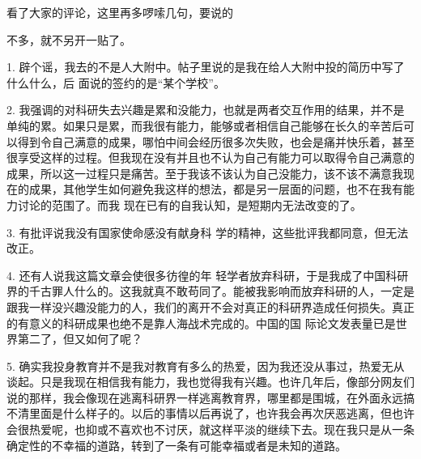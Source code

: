 \documentclass{article}
\begin{document}
看了大家的评论，这里再多啰嗦几句，要说的

\newpage
不多，就不另开一贴了。 

1. 辟个谣，我去的不是人大附中。帖子里说的是我在给人大附中投的简历中写了什么什么，后
面说的签约的是“某个学校”。 

2. 我强调的对科研失去兴趣是累和没能力，也就是两者交互作用的结果，并不是单纯的累。如果只是累，而我很有能力，能够或者相信自己能够在长久的辛苦后可以得到令自己满意的成果，哪怕中间会经历很多次失败，也会是痛并快乐着，甚至很享受这样的过程。但我现在没有并且也不认为自己有能力可以取得令自己满意的成果，所以这一过程只是痛苦。至于我该不该认为自己没能力，该不该不满意我现在的成果，其他学生如何避免我这样的想法，都是另一层面的问题，也不在我有能力讨论的范围了。而我
现在已有的自我认知，是短期内无法改变的了。 

3. 有批评说我没有国家使命感没有献身科
学的精神，这些批评我都同意，但无法改正。 

4. 还有人说我这篇文章会使很多彷徨的年
\newpage
轻学者放弃科研，于是我成了中国科研界的千古罪人什么的。这我就真不敢苟同了。能被我影响而放弃科研的人，一定是跟我一样没兴趣没能力的人，我们的离开不会对真正的科研界造成任何损失。真正的有意义的科研成果也绝不是靠人海战术完成的。中国的国
际论文发表量已是世界第二了，但又如何了呢？ 

5. 确实我投身教育并不是我对教育有多么的热爱，因为我还没从事过，热爱无从谈起。只是我现在相信我有能力，我也觉得我有兴趣。也许几年后，像部分网友们说的那样，我会像现在逃离科研界一样逃离教育界，哪里都是围城，在外面永远搞不清里面是什么样子的。以后的事情以后再说了，也许我会再次厌恶逃离，但也许会很热爱呢，也抑或不喜欢也不讨厌，就这样平淡的继续下去。现在我只是从一条确定性的不幸福的道路，转到了一条有可能幸福或者是未知的道路。
\end{document}
